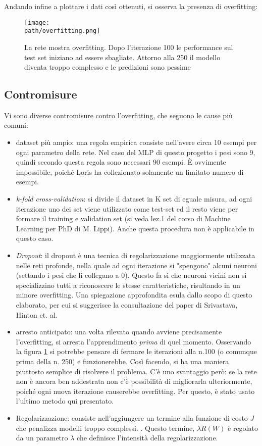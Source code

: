Andando infine a plottare i dati così ottenuti, si osserva la presenza di overfitting: 
\begin{figure}[h!]
 \centering
 \texttt{[image: \\path/overfitting.png]}
 \caption{La rete mostra overfitting. Dopo l'iterazione 100 le performance sul test set iniziano ad essere sbagliate. Attorno alla 250 il modello diventa troppo complesso e le predizioni sono pessime}
 \label{fig:overfitting}
\end{figure}


\subsection{Contromisure}
Vi sono diverse contromisure contro l'overfitting, che seguono le cause più comuni: 
\begin{itemize}
\item dataset più ampio: una regola empirica consiste nell'avere circa 10 esempi per ogni parametro della rete. Nel caso del MLP di questo progetto i pesi sono 9, quindi secondo questa regola sono necessari 90 esempi. È ovvimente impossibile, poiché Loris ha collezionato solamente un limitato numero di esempi. 
\item \emph{k-fold cross-validation}: si divide il dataset in K set di eguale misura, ad ogni iterazione uno dei set viene utilizzato come test-set ed il resto viene per formare il training e validation set (si veda lez.1 del corso di Machine Learning per PhD di M. Lippi). Anche questa procedura non è applicabile in questo caso. 
\item \emph{Dropout}: il dropout è una tecnica di regolarizzazione maggiormente utilizzata nelle reti profonde, nella quale ad ogni iterazione si "spengono" alcuni neuroni (settando i pesi che li collegano a 0). Questo fa sì che neuroni vicini non si specializzino tutti a riconoscere le stesse caratteristiche, risultando in un minore overfitting. Una spiegazione approfondita esula dallo scopo di questo elaborato, per cui si suggerisce la consultazione del paper di Srivastava, Hinton et. al\parencite{Dropout}.  
\item arresto anticipato: una volta rilevato quando avviene precisamente l'overfitting, si arresta l'apprendimento \emph{prima} di quel momento. Osservando la figura \ref{fig:overfitting} si potrebbe pensare di fermare le iterazioni alla n.100 (o comunque prima della n. 250) e funzionerebbe. Così facendo, si ha una maniera piuttosto semplice di risolvere il problema. C'è uno svantaggio però: se la rete non è ancora ben addestrata non c'è possibilità di migliorarla ulteriormente, poiché ogni nuova iterazione causerebbe overfitting. Per questo, è stato usato l'ultimo metodo qui presentato. 
\item Regolarizzazione: consiste nell'aggiungere un termine alla funzione di costo $J$ che penalizza modelli troppo complessi. \parencite{WLippi}. Questo termine, $\lambda R(W)$ è regolato da un parametro $\lambda$ che definisce l'intensità della regolarizzazione. 
\end{itemize}\\
